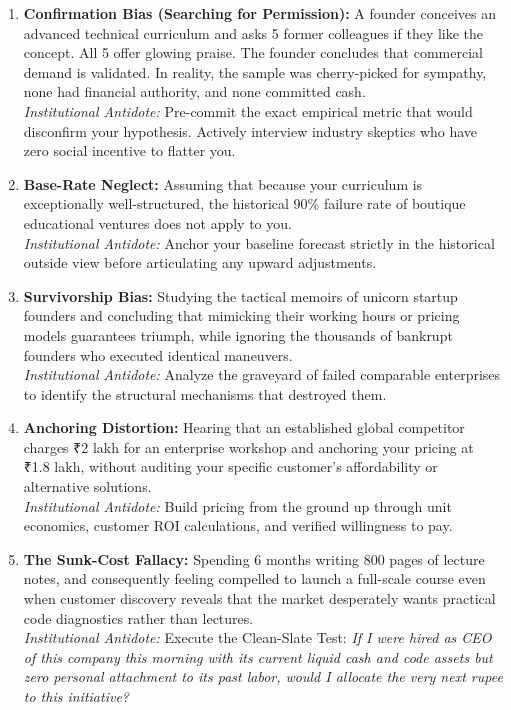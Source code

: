 \begin{enumerate}[leftmargin=12pt,itemsep=3pt,topsep=2pt,parsep=0pt]
  \item \textbf{Confirmation Bias (Searching for Permission):} A founder conceives an advanced technical curriculum and asks 5 former colleagues if they like the concept. All 5 offer glowing praise. The founder concludes that commercial demand is validated. In reality, the sample was cherry-picked for sympathy, none had financial authority, and none committed cash. \\
  \textit{Institutional Antidote:} Pre-commit the exact empirical metric that would disconfirm your hypothesis. Actively interview industry skeptics who have zero social incentive to flatter you.

  \item \textbf{Base-Rate Neglect:} Assuming that because your curriculum is exceptionally well-structured, the historical 90\% failure rate of boutique educational ventures does not apply to you. \\
  \textit{Institutional Antidote:} Anchor your baseline forecast strictly in the historical outside view before articulating any upward adjustments.

  \item \textbf{Survivorship Bias:} Studying the tactical memoirs of unicorn startup founders and concluding that mimicking their working hours or pricing models guarantees triumph, while ignoring the thousands of bankrupt founders who executed identical maneuvers. \\
  \textit{Institutional Antidote:} Analyze the graveyard of failed comparable enterprises to identify the structural mechanisms that destroyed them.

  \item \textbf{Anchoring Distortion:} Hearing that an established global competitor charges ₹2 lakh for an enterprise workshop and anchoring your pricing at ₹1.8 lakh, without auditing your specific customer's affordability or alternative solutions. \\
  \textit{Institutional Antidote:} Build pricing from the ground up through unit economics, customer ROI calculations, and verified willingness to pay.

  \item \textbf{The Sunk-Cost Fallacy:} Spending 6 months writing 800 pages of lecture notes, and consequently feeling compelled to launch a full-scale course even when customer discovery reveals that the market desperately wants practical code diagnostics rather than lectures. \\
  \textit{Institutional Antidote:} Execute the Clean-Slate Test: \textit{If I were hired as CEO of this company this morning with its current liquid cash and code assets but zero personal attachment to its past labor, would I allocate the very next rupee to this initiative?}


\end{enumerate}
